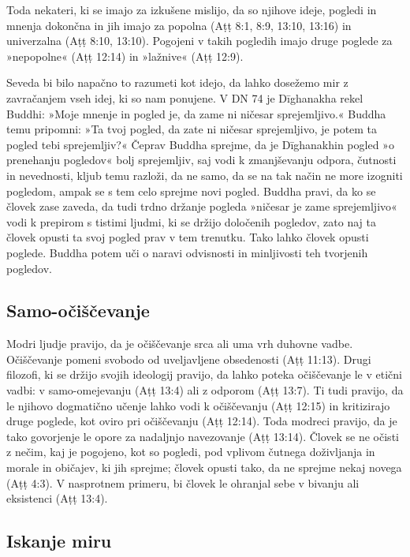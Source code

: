 Toda nekateri, ki se imajo za izkušene mislijo, da so njihove ideje,
pogledi in mnenja dokončna in jih imajo za popolna (Aṭṭ 8:1, 8:9, 13:10,
13:16) in univerzalna (Aṭṭ 8:10, 13:10). Pogojeni v takih pogledih imajo
druge poglede za »nepopolne« (Aṭṭ 12:14) in »lažnive« (Aṭṭ 12:9).

Seveda bi bilo napačno to razumeti kot idejo, da lahko dosežemo mir z
zavračanjem vseh idej, ki so nam ponujene. V DN 74 je Dīghanakha rekel
Buddhi: »Moje mnenje in pogled je, da zame ni ničesar sprejemljivo.«
Buddha temu pripomni: »Ta tvoj pogled, da zate ni ničesar sprejemljivo,
je potem ta pogled tebi sprejemljiv?« Čeprav Buddha sprejme, da je
Dīghanakhin pogled »o prenehanju pogledov« bolj sprejemljiv, saj vodi k
zmanjševanju odpora, čutnosti in nevednosti, kljub temu razloži, da ne
samo, da se na tak način ne more izogniti pogledom, ampak se s tem celo
sprejme novi pogled. Buddha pravi, da ko se človek zase zaveda, da tudi
trdno držanje pogleda »ničesar je zame sprejemljivo« vodi k prepirom s
tistimi ljudmi, ki se držijo določenih pogledov, zato naj ta človek
opusti ta svoj pogled prav v tem trenutku. Tako lahko človek opusti
poglede. Buddha potem uči o naravi odvisnosti in minljivosti teh
tvorjenih pogledov.

\subsection{Samo-očiščevanje}

Modri ljudje pravijo, da je
očiščevanje srca ali uma vrh duhovne vadbe. Očiščevanje pomeni svobodo
od uveljavljene obsedenosti (Aṭṭ 11:13). Drugi filozofi, ki se držijo
svojih ideologij pravijo, da lahko poteka očiščevanje le v etični vadbi:
v samo-omejevanju (Aṭṭ 13:4) ali z odporom (Aṭṭ 13:7). Ti tudi pravijo,
da le njihovo dogmatično učenje lahko vodi k očiščevanju (Aṭṭ 12:15) in
kritizirajo druge poglede, kot oviro pri očiščevanju (Aṭṭ 12:14). Toda
modreci pravijo, da je tako govorjenje le opore za nadaljnjo navezovanje
(Aṭṭ 13:14). Človek se ne očisti z nečim, kaj je pogojeno, kot so
pogledi, pod vplivom čutnega doživljanja in morale in običajev, ki jih
sprejme; človek opusti tako, da ne sprejme nekaj novega (Aṭṭ 4:3). V
nasprotnem primeru, bi človek le ohranjal sebe v bivanju ali eksistenci
(Aṭṭ 13:4).

\subsection{Iskanje miru}

